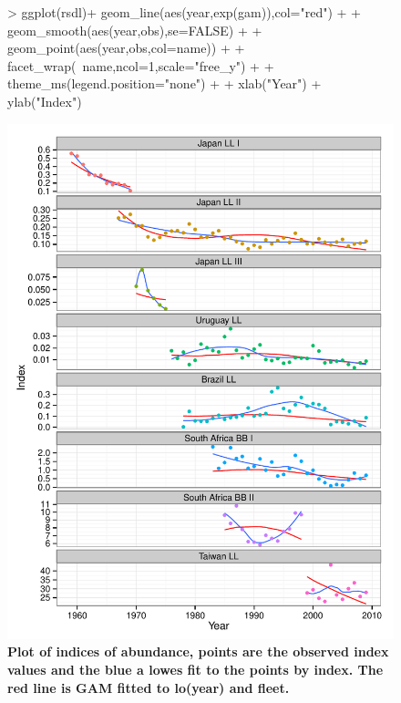 \documentclass[shortnames,nojss,article]{jss}
\begin{document}
\begin{figure}\begin{center}
\begin{Schunk}
\begin{Sinput}
> ggplot(rsdl)+ geom_line(aes(year,exp(gam)),col="red")  +
+               geom_smooth(aes(year,obs),se=FALSE)      +           
+               geom_point(aes(year,obs,col=name))       +
+               facet_wrap(~name,ncol=1,scale="free_y")  +
+               theme_ms(legend.position="none")         +
+               xlab("Year") + ylab("Index")
\end{Sinput}
\end{Schunk}
\includegraphics{diags-013}
\caption{\bf{Plot of indices of abundance, points are the observed index values and the blue a 
lowes fit to the points by index. The red line is GAM fitted to lo(year) and fleet.}}
\label{cpue:1} 
\end{center}\end{figure}
\end{document}
